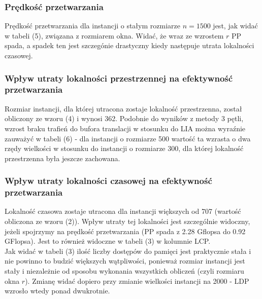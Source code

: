 \documentclass[10pt,a4paper]{article}
\begin{document}
\subsubsection*{Prędkość przetwarzania}
Prędkość przetwarzania dla instancji o stałym rozmiarze $n=1500$ jest, jak widać w tabeli (5), związana
z rozmiarem okna. Widać, że wraz ze wzrostem $r$ PP spada, a spadek ten jest szczegónie drastyczny kiedy następuje 
utrata lokalności czasowej.

\subsubsection*{Wpływ utraty lokalności przestrzennej na efektywność przetwarzania}
Rozmiar instancji, dla której utracona zostaje lokalność przestrzenna, został obliczony ze wzoru (4) i wynosi 362. 
Podobnie do wyników z metody 3 pętli, wzrost braku trafień do bufora translacji w stosunku do LIA można wyraźnie zauważyć
w tabeli (6) - dla instancji o rozmiarze 500 wartość ta wzrasta o dwa rzędy wielkości w stosunku do instancji o rozmiarze 
300, dla której lokalność przestrzenna była jeszcze zachowana.

\subsubsection*{Wpływ utraty lokalności czasowej na efektywność przetwarzania}
Lokalność czasowa zostaje utracona dla instancji większych od 707 (wartość obliczona ze wzoru (2)). Wpływ utraty tej lokalności
jest szczególnie widoczny, jeżeli spojrzymy na prędkość przetwarzania (PP spada z 2.28 Gflopsa do 0.92 GFlopsa). Jest to również
widoczne w tabeli (3) w kolumnie LCP.\\

Jak widać w tabeli (3) ilość liczby dostępów do pamięci jest praktycznie stała i nie powinno to budzić większych wątpliwości, ponieważ
rozmiar instancji jest stały i niezależnie od sposobu wykonania wszystkich obliczeń (czyli rozmiaru okna $r$). Zmianę widać dopiero przy 
zmianie wielkości instancji na 2000 - LDP wzrosło wtedy ponad dwukrotnie.
\end{document}
